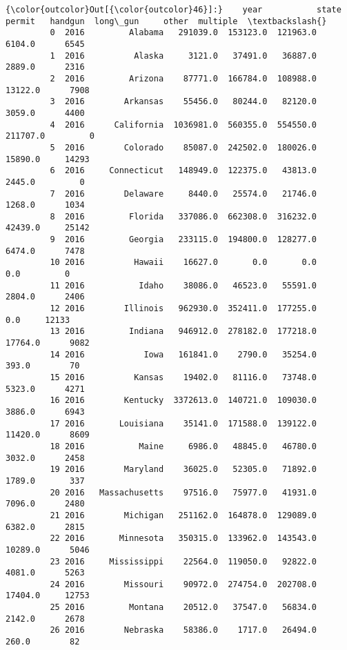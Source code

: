 \documentclass[11pt]{article}
\begin{document}
\begin{Verbatim}[commandchars=\\\{\}]
{\color{outcolor}Out[{\color{outcolor}46}]:}    year           state     permit   handgun  long\_gun     other  multiple  \textbackslash{}
         0  2016         Alabama   291039.0  153123.0  121963.0    6104.0      6545   
         1  2016          Alaska     3121.0   37491.0   36887.0    2889.0      2316   
         2  2016         Arizona    87771.0  166784.0  108988.0   13122.0      7908   
         3  2016        Arkansas    55456.0   80244.0   82120.0    3059.0      4400   
         4  2016      California  1036981.0  560355.0  554550.0  211707.0         0   
         5  2016        Colorado    85087.0  242502.0  180026.0   15890.0     14293   
         6  2016     Connecticut   148949.0  122375.0   43813.0    2445.0         0   
         7  2016        Delaware     8440.0   25574.0   21746.0    1268.0      1034   
         8  2016         Florida   337086.0  662308.0  316232.0   42439.0     25142   
         9  2016         Georgia   233115.0  194800.0  128277.0    6474.0      7478   
         10 2016          Hawaii    16627.0       0.0       0.0       0.0         0   
         11 2016           Idaho    38086.0   46523.0   55591.0    2804.0      2406   
         12 2016        Illinois   962930.0  352411.0  177255.0       0.0     12133   
         13 2016         Indiana   946912.0  278182.0  177218.0   17764.0      9082   
         14 2016            Iowa   161841.0    2790.0   35254.0     393.0        70   
         15 2016          Kansas    19402.0   81116.0   73748.0    5323.0      4271   
         16 2016        Kentucky  3372613.0  140721.0  109030.0    3886.0      6943   
         17 2016       Louisiana    35141.0  171588.0  139122.0   11420.0      8609   
         18 2016           Maine     6986.0   48845.0   46780.0    3032.0      2458   
         19 2016        Maryland    36025.0   52305.0   71892.0    1789.0       337   
         20 2016   Massachusetts    97516.0   75977.0   41931.0    7096.0      2480   
         21 2016        Michigan   251162.0  164878.0  129089.0    6382.0      2815   
         22 2016       Minnesota   350315.0  133962.0  143543.0   10289.0      5046   
         23 2016     Mississippi    22564.0  119050.0   92822.0    4081.0      5263   
         24 2016        Missouri    90972.0  274754.0  202708.0   17404.0     12753   
         25 2016         Montana    20512.0   37547.0   56834.0    2142.0      2678   
         26 2016        Nebraska    58386.0    1717.0   26494.0     260.0        82   

\end{Verbatim}
\end{document}
